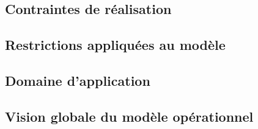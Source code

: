 \subsection{Contraintes de réalisation}


\subsection{Restrictions appliquées au modèle}


\subsection{Domaine d'application}


\subsection{Vision globale du modèle opérationnel}
